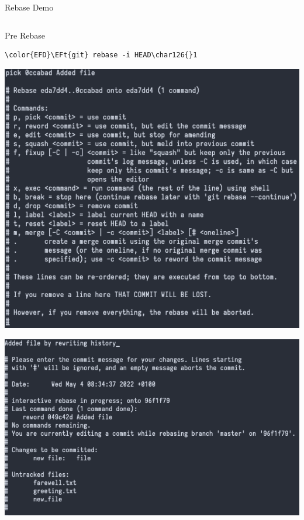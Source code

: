 \documentclass[presentation]{beamer}
\newcommand{\EFt}[1]{\textcolor{EFt}{#1}} %
\begin{document}
\begin{frame}[label={sec:orgb47ec8b},fragile,shrink=40]{Rebase Demo}
 \begin{columns}
\begin{column}{0.8\columnwidth}
\begin{block}{Pre Rebase}
\begin{Code}
\begin{Verbatim}
\color{EFD}\EFt{git} rebase -i HEAD\char126{}1
\end{Verbatim}
\end{Code}

\begin{center}
\includegraphics[width=.9\linewidth]{rebase.png}
\end{center}

\begin{center}
\includegraphics[width=.9\linewidth]{rebase_3.png}
\end{center}
\end{block}
\end{column}


\end{columns}
\end{frame}
\end{document}
